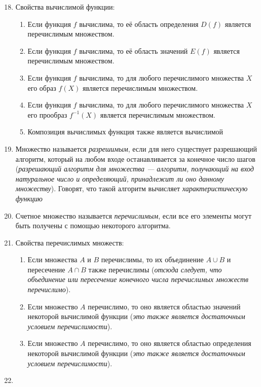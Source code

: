 \documentclass[a4paper,12pt]{article}
\begin{document}
\begin{enumerate}
    \setcounter{enumi}{17}
	\item
    Свойства вычислимой функции:
    \begin{enumerate}
        \item Если функция $f$ вычислима, то её область определения $D(f)$ является перечислимым множеством.
        \item Если функция $f$ вычислима, то её область значений $E(f)$ является перечислимым множеством.
        \item Если функция $f$ вычислима, то для любого перечислимого множества $X$ его образ $f(X)$ является перечислимым множеством.
        \item Если функция $f$ вычислима, то для любого перечислимого множества $X$ его прообраз $f^{-1}(X)$ является перечислимым множеством.
        \item Композиция вычислимых функция также является вычислимой
    \end{enumerate}
    \item
    Множество называется \textit{разрешимым}, если для него существует разрешающий алгоритм, который на любом входе останавливается за конечное число шагов ({\itshape разрешающий алгоритм для множества --- алгоритм, получающий на вход натуральное число и определяющий, принадлежит ли оно данному множеству}). Говорят, что такой алгоритм вычисляет \textit{характеристическую функцию}
    \item
    Счетное множество называется \textit{перечислимым}, если все его элементы могут быть получены с помощью некоторого алгоритма.
    \item
    Свойства перечислимых множеств:
    \begin{enumerate}
        \item Если множества $A$ и $B$ перечислимы, то их объединение $A \cup B$ и пересечение $A \cap B$ также перечислимы (\textit{отсюда следует, что объединение или пересечение конечного числа перечислимых множеств перечислимо}).
        \item Если множество $A$ перечислимо, то оно является областью значений некоторой вычислимой функции (\textit{это также является достаточным условием перечислимости}).
        \item Если множество $A$ перечислимо, то оно является областью определения некоторой вычислимой функции (\textit{это также является достаточным условием перечислимости}).
    \end{enumerate}
    \item

\end{enumerate}
\end{document}
